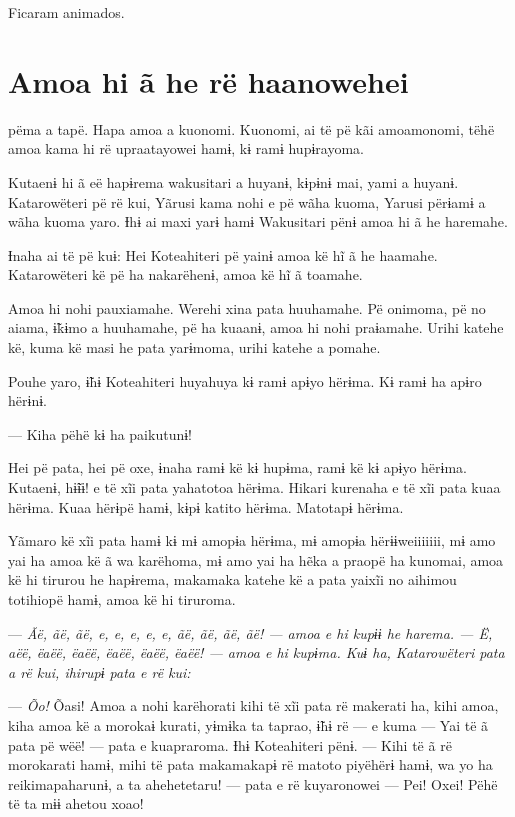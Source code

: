 Ficaram animados.

\chapter{Amoa hi ã he rë haanowehei}

 pëma a tapë. Hapa amoa a kuonomi. Kuonomi, ai të pë kãi amoamonomi,
tëhë amoa kama hi rë upraatayowei hamɨ, kɨ ramɨ hupɨrayoma. 

Kutaenɨ hi ã eë hapɨrema wakusitari a huyanɨ, kɨpɨnɨ mai, yami a huyanɨ.
Katarowëteri pë rë kui, Yãrusi kama nohi e pë wãha kuoma, Yarusi përɨamɨ
a wãha kuoma yaro. Ɨhɨ ai maxi yarɨ hamɨ Wakusitari pënɨ amoa hi ã he
haremahe.

Ɨnaha ai të pë kuɨ: Hei Koteahiteri pë yainɨ amoa kë hĩ ã he haamahe.
 Katarowëteri kë pë ha nakarëhenɨ, amoa kë hĩ ã toamahe. 

Amoa hi nohi pauxiamahe. Werehi xina pata huuhamahe. Pë onimoma, pë no
aiama, ɨ̃kɨmo a huuhamahe, pë ha kuaanɨ, amoa hi nohi praɨamahe. Urihi
katehe kë, kuma kë masi he pata yarɨmoma, urihi katehe a pomahe. 

Pouhe yaro, ɨ̃hɨ Koteahiteri huyahuya kɨ ramɨ apɨyo hërɨma. Kɨ ramɨ ha
 apɨro hërɨnɨ. 

--- Kiha pëhë kɨ ha paikutunɨ! 

Hei pë pata, hei pë oxe, ɨnaha ramɨ kë kɨ hupɨma, ramɨ kë kɨ apɨyo
hërɨma. Kutaenɨ, hɨ̃ɨɨ! e të xĩi pata yahatotoa hërɨma. Hikari kurenaha e
të xĩi pata kuaa hërɨma. Kuaa hërɨpë hamɨ, kɨpɨ katito hërɨma. Matotapɨ
hërɨma. 

Yãmaro kë xĩi pata hamɨ kɨ mɨ amopɨa hërɨma, mɨ amopɨa hërɨɨweiiiiiii,
 mɨ amo yai ha amoa kë ã wa karëhoma, mɨ amo yai ha hẽka a praopë ha
 kunomai, amoa kë hi tirurou he hapɨrema, makamaka katehe kë a pata
 yaixĩi no aihimou totihiopë hamɨ, amoa kë hi tiruroma. 

--- \textit{Ãë, ãë, ãë, e, e, e, e, e, ãë, ãë, ãë, ãë! --- amoa e hi kupɨɨ he
 harema. --- \textit{Ë, aëë, ëaëë, ëaëë, ëaëë, ëaëë, ëaëë!} --- amoa e hi kupɨma.
 Kuɨ ha, Katarowëteri pata a rë kui, ihirupɨ pata e rë kui:}

--- \textit{Õo!} Õasi! Amoa a nohi karëhorati kihi të xĩi pata rë makerati ha,
 kihi amoa, kiha amoa kë a morokaɨ kurati, yɨmɨka ta taprao, ɨ̃hɨ rë --- e
 kuma --- Yai të ã pata pë wëë! --- pata e kuapraroma. Ɨhɨ Koteahiteri
 pënɨ. --- Kihi të ã rë morokarati hamɨ, mihi të pata makamakapɨ rë
 matoto piyëhërɨ hamɨ, wa yo ha reikimapaharunɨ, a ta ahehetetaru! ---
 pata e rë kuyaronowei --- Pei! Oxei! Pëhë të ta mɨɨ ahetou xoao! 

